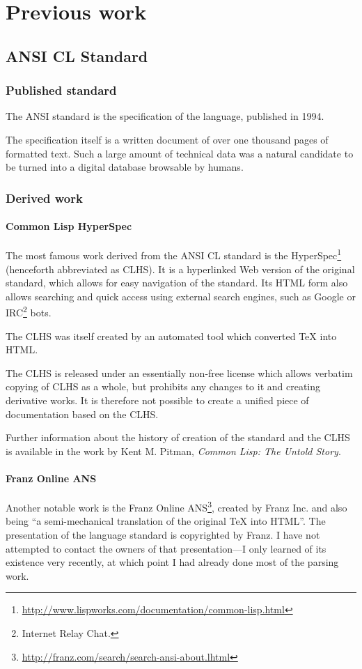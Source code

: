 \section{Previous work}

\subsection{ANSI CL Standard}

\subsubsection{Published standard}

The ANSI \cl{} standard\cite{ANSI:1994:standard} is the specification of the \cl{} language, published in 1994.

The specification itself is a written document of over one thousand pages of formatted text. Such a large amount of technical data was a natural candidate to be turned into a digital database browsable by humans.
\subsubsection{Derived work}
\paragraph{Common Lisp HyperSpec}
The most famous work derived from the ANSI CL standard is the \cl{} HyperSpec\footnote{\url{http://www.lispworks.com/documentation/common-lisp.html}} (henceforth abbreviated as CLHS). It is a hyperlinked Web version of the original standard, which allows for easy navigation of the standard. Its HTML form also allows searching and quick access using external search engines, such as Google or IRC\footnote{Internet Relay Chat.} bots.

The CLHS was itself created by an automated tool which converted TeX into HTML.

The CLHS is released under an essentially non-free license which allows verbatim copying of CLHS as a whole, but prohibits any changes to it and creating derivative works. It is therefore not possible to create a unified piece of \cl{} documentation based on the CLHS.

Further information about the history of creation of the standard and the CLHS is available in the work by Kent M. Pitman, \textit{Common Lisp: The Untold Story}\cite{kmp:2012:untold}.

\paragraph{Franz Online ANS}
Another notable work is the Franz Online ANS\footnote{\url{
http://franz.com/search/search-ansi-about.lhtml}}, created by Franz Inc. and also being ``a semi-mechanical translation of the original TeX into HTML''. The presentation of the language standard is copyrighted by Franz. I have not attempted to contact the owners of that presentation---I only learned of its existence very recently, at which point I had already done most of the parsing work.

